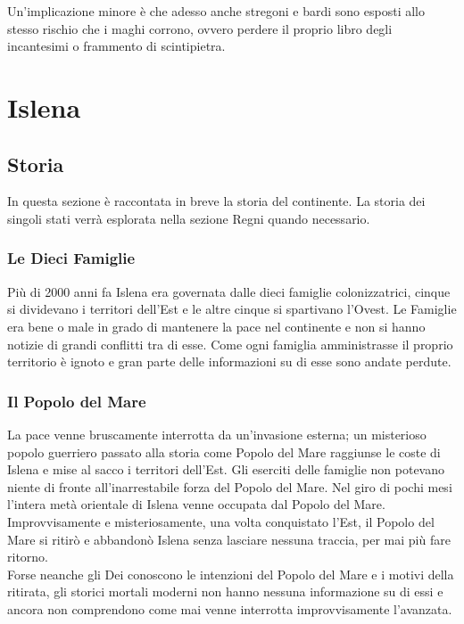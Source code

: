 \documentclass[a4paper]{report}
\begin{document}
\begin{multicols}{2}
Un'implicazione minore è che adesso anche stregoni e bardi sono esposti allo stesso rischio che i maghi corrono, ovvero perdere il proprio libro degli incantesimi o frammento di scintipietra.


\end{multicols}

\part{Islena}

\chapter{Storia}
\begin{multicols}{2}	
	In questa sezione è raccontata in breve la storia del continente. La storia dei singoli stati verrà esplorata nella sezione Regni quando necessario. 
\section*{Le Dieci Famiglie}
Più di 2000 anni fa Islena era governata dalle dieci famiglie colonizzatrici, cinque si dividevano i territori dell'Est e le altre cinque si spartivano l'Ovest. Le Famiglie era bene o male in grado di mantenere la pace nel continente e non si hanno notizie di grandi conflitti tra di esse. Come ogni famiglia amministrasse il proprio territorio è ignoto e gran parte delle informazioni su di esse sono andate perdute. 
\section*{Il Popolo del Mare}
La pace venne bruscamente interrotta da un’invasione esterna; un misterioso popolo guerriero passato alla storia come Popolo del Mare raggiunse le coste di Islena e mise al sacco i territori dell’Est. Gli eserciti delle famiglie non potevano niente di fronte all’inarrestabile forza del Popolo del Mare. Nel giro di pochi mesi l’intera metà orientale di Islena venne occupata dal Popolo del Mare.\\
Improvvisamente e misteriosamente, una volta conquistato l’Est, il Popolo del Mare si ritirò e abbandonò Islena senza lasciare nessuna traccia, per mai più fare ritorno. \\
Forse neanche gli Dei conoscono le intenzioni del Popolo del Mare e i motivi della ritirata, gli storici mortali moderni non hanno nessuna informazione su di essi e ancora non comprendono come mai venne interrotta improvvisamente l’avanzata. 

\end{multicols}
\end{document}
